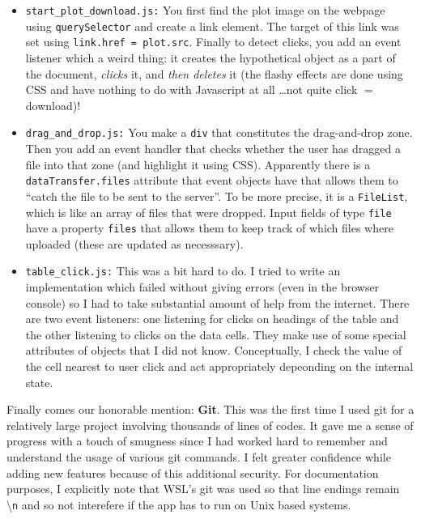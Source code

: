 \documentclass[11pt]{scrartcl}
\begin{document}
\begin{itemize}
  \item \texttt{start\_plot\_download.js:} You first find the plot image on the
    webpage using \texttt{querySelector} and create a link element. The target
    of this link was set using \texttt{link.href = plot.src}. Finally to detect
    clicks, you add an event listener which a weird thing: it creates the
    hypothetical object as a part of the document, \emph{clicks} it, and
    \emph{then deletes} it (the flashy effects are done using CSS and have
    nothing to do with Javascript at all \dots not quite click $=$ download)!
  \item \texttt{drag\_and\_drop.js:} You make a \texttt{div} that constitutes
    the drag-and-drop zone. Then you add an event handler that checks whether
    the user has dragged a file into that zone (and highlight it using CSS).
    Apparently there is a \texttt{dataTransfer.files} attribute that event
    objects have that allows them to ``catch the file to be sent to the
    server''. To be more precise, it is a \texttt{FileList}, which is like an
    array of files that were dropped. Input fields of type \texttt{file} have a
    property \texttt{files} that allows them to keep track of which files where
    uploaded (these are updated as necesssary).
  \item \texttt{table\_click.js:} This was a bit hard to do. I tried to write an
    implementation which failed without giving errors (even in the browser
    console) so I had to take substantial amount of help from the internet.
    There are two event listeners: one listening for clicks on headings of the
    table and the other listening to clicks on the data cells. They make use of
    some special attributes of objects that I did not know. Conceptually, I
    check the value of the cell nearest to user click and act appropriately
    depeonding on the internal state.

\end{itemize}

Finally comes our honorable mention: \textbf{Git}. This was the first time I used
git for a relatively large project involving thousands of lines of codes. It
gave me a sense of progress with a touch of smugness since I had worked hard to
remember and understand the usage of various git commands. I felt greater
confidence while adding new features because of this additional security. For
documentation purposes, I explicitly note that WSL's git was used so that line
endings remain \textbackslash\texttt{n} and so not interefere if the app has to
run on Unix based systems.
\end{document}
